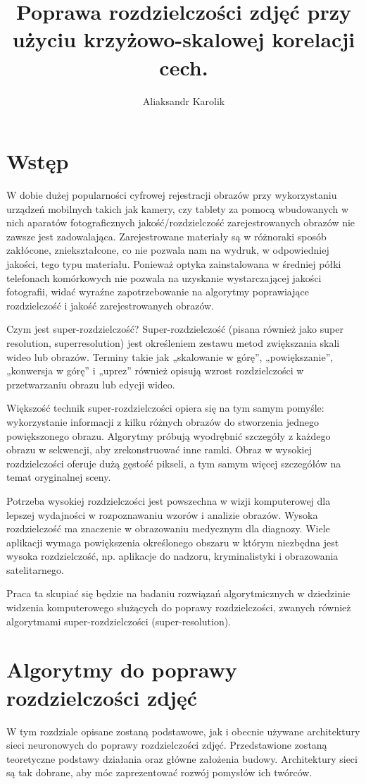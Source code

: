 \documentclass[a4paper,12pt,twoside,openany]{report}
\title{Poprawa rozdzielczości zdjęć przy użyciu krzyżowo-skalowej korelacji cech.}
\author{Aliaksandr Karolik}
\begin{document}
\maketitle

\chapter{Wstęp}
	W dobie dużej popularności cyfrowej rejestracji obrazów przy wykorzystaniu urządzeń mobilnych takich jak kamery, czy tablety za pomocą wbudowanych w  nich aparatów fotograficznych jakość/rozdzielczość zarejestrowanych obrazów nie zawsze jest zadowalająca. Zarejestrowane materiały są w różnoraki sposób zakłócone, zniekształcone, co nie pozwala nam na wydruk, w odpowiedniej jakości, tego typu materiału. Ponieważ optyka zainstalowana w średniej półki telefonach komórkowych nie pozwala na uzyskanie wystarczającej jakości fotografii, widać wyraźne zapotrzebowanie na algorytmy poprawiające rozdzielczość i jakość zarejestrowanych obrazów.
	
	Czym jest super-rozdzielczość? Super-rozdzielczość (pisana również jako super resolution, superresolution) jest określeniem zestawu metod zwiększania skali wideo lub obrazów. Terminy takie jak „skalowanie w górę”, „powiększanie”, „konwersja w górę” i „uprez” również opisują wzrost rozdzielczości w przetwarzaniu obrazu lub edycji wideo. 
	
	Większość technik super-rozdzielczości opiera się na tym samym pomyśle: wykorzystanie informacji z kilku różnych obrazów do stworzenia jednego powiększonego obrazu. Algorytmy próbują wyodrębnić szczegóły z każdego obrazu w sekwencji, aby zrekonstruować inne ramki. Obraz w wysokiej rozdzielczości oferuje dużą gęstość pikseli, a tym samym więcej szczegółów na temat oryginalnej sceny.

	Potrzeba wysokiej rozdzielczości jest powszechna w wizji komputerowej dla lepszej wydajności w rozpoznawaniu wzorów i analizie obrazów. Wysoka rozdzielczość ma znaczenie w obrazowaniu medycznym dla diagnozy. Wiele aplikacji wymaga powiększenia określonego obszaru w którym niezbędna jest wysoka rozdzielczość, np. aplikacje do nadzoru, kryminalistyki i obrazowania satelitarnego.

	Praca ta skupiać się będzie na badaniu rozwiązań algorytmicznych w dziedzinie widzenia komputerowego służących do poprawy rozdzielczości, zwanych również algorytmami super-rozdzielczości (super-resolution). 


\chapter{Algorytmy do poprawy rozdzielczości zdjęć}
W tym rozdziale opisane zostaną podstawowe, jak i obecnie używane architektury sieci neuronowych  do poprawy rozdzielczości zdjęć. Przedstawione zostaną teoretyczne podstawy działania oraz główne założenia budowy. Architektury sieci są tak dobrane, aby móc zaprezentować rozwój pomysłów ich twórców.
\end{document}
